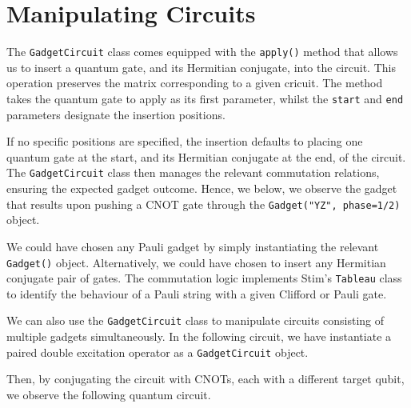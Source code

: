 \section{Manipulating Circuits}

The \lstinline{GadgetCircuit} class comes equipped with the \lstinline{apply()} method that allows us to insert a quantum gate, and its Hermitian conjugate, into the circuit. This operation preserves the matrix corresponding to a given cricuit. The method takes the quantum gate to apply as its first parameter, whilst the \lstinline{start} and \lstinline{end} parameters designate the insertion positions.


If no specific positions are specified, the insertion defaults to placing one quantum gate at the start, and its Hermitian conjugate at the end, of the circuit. The \lstinline{GadgetCircuit} class then manages the relevant commutation relations, ensuring the expected gadget outcome. Hence, we below, we observe the gadget that results upon pushing a CNOT gate through the \lstinline{Gadget("YZ", phase=1/2)} object.


We could have chosen any Pauli gadget by simply instantiating the relevant \lstinline{Gadget()} object. Alternatively, we could have chosen to insert any Hermitian conjugate pair of gates. The commutation logic implements Stim's \lstinline{Tableau} class to identify the behaviour of a Pauli string with a given Clifford or Pauli gate.


We can also use the \lstinline{GadgetCircuit} class to manipulate circuits consisting of multiple gadgets simultaneously. In the following circuit, we have instantiate a paired double excitation operator as a \lstinline{GadgetCircuit} object.


Then, by conjugating the circuit with CNOTs, each with a different target qubit, we observe the following quantum circuit.

